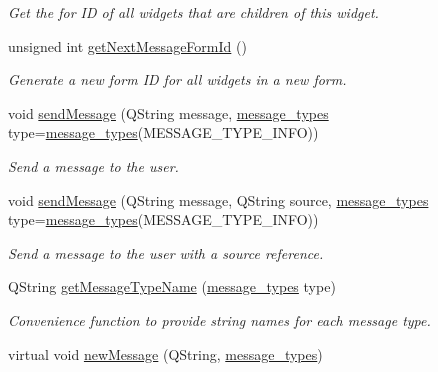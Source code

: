 \begin{DoxyCompactItemize}
\begin{DoxyCompactList}\small\item\em Get the for ID of all widgets that are children of this widget. \end{DoxyCompactList}\item 
\hypertarget{classUserMessage_a6acc4d4b0bb012d15f1f41d1360452b2}{
unsigned int \hyperlink{classUserMessage_a6acc4d4b0bb012d15f1f41d1360452b2}{getNextMessageFormId} ()}
\label{classUserMessage_a6acc4d4b0bb012d15f1f41d1360452b2}

\begin{DoxyCompactList}\small\item\em Generate a new form ID for all widgets in a new form. \end{DoxyCompactList}\item 
\hypertarget{classUserMessage_ad4287bb64b8f7a8af52db1ad3356a3bf}{
void \hyperlink{classUserMessage_ad4287bb64b8f7a8af52db1ad3356a3bf}{sendMessage} (QString message, \hyperlink{classmessage__types}{message\_\-types} type=\hyperlink{classmessage__types}{message\_\-types}(MESSAGE\_\-TYPE\_\-INFO))}
\label{classUserMessage_ad4287bb64b8f7a8af52db1ad3356a3bf}

\begin{DoxyCompactList}\small\item\em Send a message to the user. \end{DoxyCompactList}\item 
\hypertarget{classUserMessage_ab64bf3dd182ba077f75b6516ac873756}{
void \hyperlink{classUserMessage_ab64bf3dd182ba077f75b6516ac873756}{sendMessage} (QString message, QString source, \hyperlink{classmessage__types}{message\_\-types} type=\hyperlink{classmessage__types}{message\_\-types}(MESSAGE\_\-TYPE\_\-INFO))}
\label{classUserMessage_ab64bf3dd182ba077f75b6516ac873756}

\begin{DoxyCompactList}\small\item\em Send a message to the user with a source reference. \end{DoxyCompactList}\item 
\hypertarget{classUserMessage_a260f472e675bbdb217db78dbed20af6d}{
QString \hyperlink{classUserMessage_a260f472e675bbdb217db78dbed20af6d}{getMessageTypeName} (\hyperlink{classmessage__types}{message\_\-types} type)}
\label{classUserMessage_a260f472e675bbdb217db78dbed20af6d}

\begin{DoxyCompactList}\small\item\em Convenience function to provide string names for each message type. \end{DoxyCompactList}\item 
\hypertarget{classUserMessage_aaa90a4f74b724bb1188307bf623f4212}{
virtual void \hyperlink{classUserMessage_aaa90a4f74b724bb1188307bf623f4212}{newMessage} (QString, \hyperlink{classmessage__types}{message\_\-types})}
\label{classUserMessage_aaa90a4f74b724bb1188307bf623f4212}


\end{DoxyCompactItemize}
